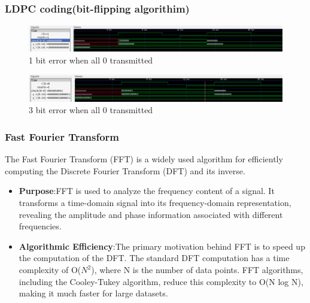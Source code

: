 \documentclass{beamer}
\begin{document}
\begin{frame}
	\frametitle{LDPC coding(bit-flipping algorithim)}
		\begin{figure}[h!]
  		\centering
    			\includegraphics[width=\linewidth]{./figs/ldpc1.png}
		\caption{1 bit error when all 0 transmitted}
		\end{figure}	
		\begin{figure}[h!]
  		\centering
    			\includegraphics[width=\linewidth]{./figs/ldpc2.png}
		\caption{3 bit error when all 0 transmitted}
		\end{figure}	

\end{frame}

\begin{frame}
	\frametitle{Fast Fourier Transform}
	The Fast Fourier Transform (FFT) is a widely used algorithm for efficiently computing the Discrete Fourier Transform (DFT) and its inverse.
	\begin{itemize}
		\item \textbf{Purpose}:FFT is used to analyze the frequency content of a signal. It transforms a time-domain signal into its frequency-domain representation, revealing the amplitude and phase information associated with different frequencies.
		\item \textbf{Algorithmic Efficiency}:The primary motivation behind FFT is to speed up the computation of the DFT. The standard DFT computation has a time complexity of O($N^2$), where N is the number of data points. FFT algorithms, including the Cooley-Tukey algorithm, reduce this complexity to O(N log N), making it much faster for large datasets.
	\end{itemize}
\end{frame}
\end{document}
